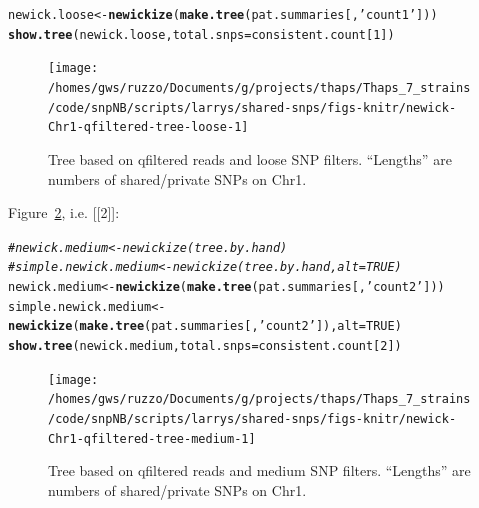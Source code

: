 \documentclass{article}\usepackage[]{graphicx}\usepackage[]{color}
\makeatletter
\newcommand{\hlnum}[1]{\textcolor[rgb]{0.686,0.059,0.569}{#1}}%
\newcommand{\hlstr}[1]{\textcolor[rgb]{0.192,0.494,0.8}{#1}}%
\newcommand{\hlcom}[1]{\textcolor[rgb]{0.678,0.584,0.686}{\textit{#1}}}%
\newcommand{\hlstd}[1]{\textcolor[rgb]{0.345,0.345,0.345}{#1}}%
\newcommand{\hlkwb}[1]{\textcolor[rgb]{0.69,0.353,0.396}{#1}}%
\newcommand{\hlkwc}[1]{\textcolor[rgb]{0.333,0.667,0.333}{#1}}%
\newcommand{\hlkwd}[1]{\textcolor[rgb]{0.737,0.353,0.396}{\textbf{#1}}}%
\newenvironment{kframe}{%
 \def\at@end@of@kframe{}%
 \ifinner\ifhmode%
  \def\at@end@of@kframe{\end{minipage}}%
  \begin{minipage}{\columnwidth}%
 \fi\fi%
 \def\FrameCommand##1{\hskip\@totalleftmargin \hskip-\fboxsep
 \colorbox{shadecolor}{##1}\hskip-\fboxsep
     \hskip-\linewidth \hskip-\@totalleftmargin \hskip\columnwidth}%
 \MakeFramed {\advance\hsize-\width
   \@totalleftmargin\z@ \linewidth\hsize
   \@setminipage}}%
 {\par\unskip\endMakeFramed%
 \at@end@of@kframe}
\newenvironment{knitrout}{}{} %
\makeatother
\begin{document}
\begin{knitrout}\scriptsize
{}\color{fgcolor}\begin{kframe}
\begin{alltt}
\hlstd{newick.loose} \hlkwb{<-} \hlkwd{newickize}\hlstd{(}\hlkwd{make.tree}\hlstd{(pat.summaries[,}\hlstr{'count1'}\hlstd{]))}
\hlkwd{show.tree}\hlstd{(newick.loose,} \hlkwc{total.snps}\hlstd{=consistent.count[}\hlnum{1}\hlstd{])}
\end{alltt}
\end{kframe}\begin{figure}

{\centering \texttt{[image: /homes/gws/ruzzo/Documents/g/projects/thaps/Thaps\_7\_strains/code/snpNB/scripts/larrys/shared-snps/figs-knitr/newick-Chr1-qfiltered-tree-loose-1]} 

}

\caption[Tree based on qfiltered reads and loose SNP filters]{Tree based on qfiltered reads and loose SNP filters.  ``Lengths'' are numbers of shared/private SNPs on Chr1.}\label{fig:tree-loose}
\end{figure}


\end{knitrout}

Figure~\ref{fig:tree-medium}, i.e. [[2]]:

\begin{knitrout}\scriptsize
{}\color{fgcolor}\begin{kframe}
\begin{alltt}
\hlcom{# newick.medium <- newickize(tree.by.hand)}
\hlcom{# simple.newick.medium <- newickize(tree.by.hand,alt=TRUE)}
\hlstd{newick.medium} \hlkwb{<-} \hlkwd{newickize}\hlstd{(}\hlkwd{make.tree}\hlstd{(pat.summaries[,}\hlstr{'count2'}\hlstd{]))}
\hlstd{simple.newick.medium} \hlkwb{<-} \hlkwd{newickize}\hlstd{(}\hlkwd{make.tree}\hlstd{(pat.summaries[,}\hlstr{'count2'}\hlstd{]),}\hlkwc{alt}\hlstd{=}\hlnum{TRUE}\hlstd{)}
\hlkwd{show.tree}\hlstd{(newick.medium,} \hlkwc{total.snps}\hlstd{=consistent.count[}\hlnum{2}\hlstd{])}
\end{alltt}
\end{kframe}\begin{figure}

{\centering \texttt{[image: /homes/gws/ruzzo/Documents/g/projects/thaps/Thaps\_7\_strains/code/snpNB/scripts/larrys/shared-snps/figs-knitr/newick-Chr1-qfiltered-tree-medium-1]} 

}

\caption[Tree based on qfiltered reads and medium SNP filters]{Tree based on qfiltered reads and medium SNP filters.  ``Lengths'' are numbers of shared/private SNPs on Chr1.}\label{fig:tree-medium}
\end{figure}


\end{knitrout}
\end{document}
